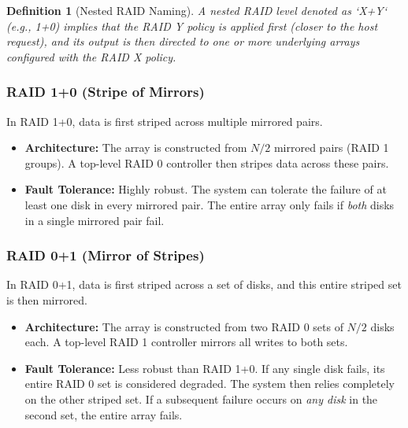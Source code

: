 \documentclass[12pt]{article}
\newtheorem{definition}{Definition}[section]
\begin{document}
\begin{definition}[Nested RAID Naming]
A nested RAID level denoted as `X+Y` (e.g., 1+0) implies that the RAID Y policy is applied first (closer to the host request), and its output is then directed to one or more underlying arrays configured with the RAID X policy.
\end{definition}

\subsubsection{RAID 1+0 (Stripe of Mirrors)}
In RAID 1+0, data is first striped across multiple mirrored pairs.
\begin{itemize}
    \item \textbf{Architecture:} The array is constructed from $N/2$ mirrored pairs (RAID 1 groups). A top-level RAID 0 controller then stripes data across these pairs.
    \item \textbf{Fault Tolerance:} Highly robust. The system can tolerate the failure of at least one disk in every mirrored pair. The entire array only fails if \textit{both} disks in a single mirrored pair fail.
\end{itemize}

\subsubsection{RAID 0+1 (Mirror of Stripes)}
In RAID 0+1, data is first striped across a set of disks, and this entire striped set is then mirrored.
\begin{itemize}
    \item \textbf{Architecture:} The array is constructed from two RAID 0 sets of $N/2$ disks each. A top-level RAID 1 controller mirrors all writes to both sets.
    \item \textbf{Fault Tolerance:} Less robust than RAID 1+0. If any single disk fails, its entire RAID 0 set is considered degraded. The system then relies completely on the other striped set. If a subsequent failure occurs on \textit{any disk} in the second set, the entire array fails. 
\end{itemize}
\end{document}

